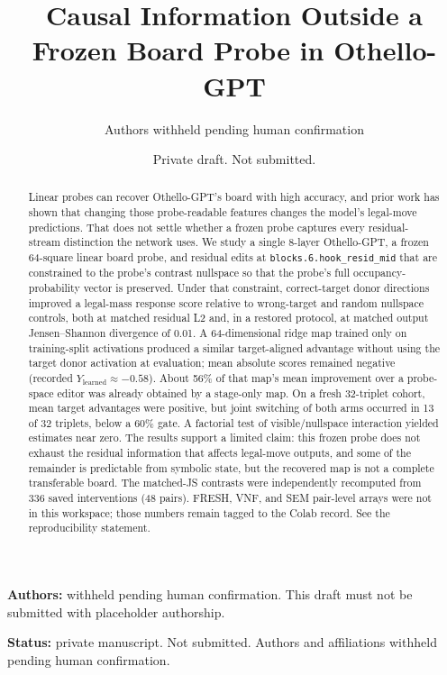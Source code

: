 \documentclass[11pt]{article}
\title{Causal Information Outside a Frozen Board Probe in Othello-GPT}
\author{Authors withheld pending human confirmation}
\date{Private draft. Not submitted.}
\begin{document}
\maketitle
\textbf{Authors:} withheld pending human confirmation. This draft must not be submitted with placeholder authorship.

\textbf{Status:} private manuscript. Not submitted. Authors and affiliations withheld pending human confirmation.

\begin{abstract}

Linear probes can recover Othello-GPT's board with high accuracy, and prior work has shown that changing those probe-readable features changes the model's legal-move predictions. That does not settle whether a frozen probe captures every residual-stream distinction the network uses. We study a single 8-layer Othello-GPT, a frozen 64-square linear board probe, and residual edits at \texttt{blocks.6.hook\_resid\_mid} that are constrained to the probe's contrast nullspace so that the probe's full occupancy-probability vector is preserved. Under that constraint, correct-target donor directions improved a legal-mass response score relative to wrong-target and random nullspace controls, both at matched residual L2 and, in a restored protocol, at matched output Jensen--Shannon divergence of 0.01. A 64-dimensional ridge map trained only on training-split activations produced a similar target-aligned advantage without using the target donor activation at evaluation; mean absolute scores remained negative (recorded \(Y_{\mathrm{learned}}\approx-0.58\)). About 56\% of that map's mean improvement over a probe-space editor was already obtained by a stage-only map. On a fresh 32-triplet cohort, mean target advantages were positive, but joint switching of both arms occurred in 13 of 32 triplets, below a 60\% gate. A factorial test of visible/nullspace interaction yielded estimates near zero. The results support a limited claim: this frozen probe does not exhaust the residual information that affects legal-move outputs, and some of the remainder is predictable from symbolic state, but the recovered map is not a complete transferable board. The matched-JS contrasts were independently recomputed from 336 saved interventions (48 pairs). FRESH, VNF, and SEM pair-level arrays were not in this workspace; those numbers remain tagged to the Colab record. See the reproducibility statement.

\end{abstract}
\end{document}
